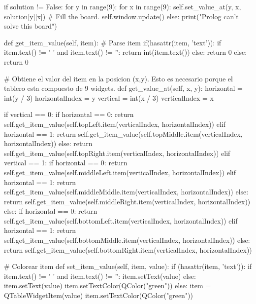 \documentclass[10pt,a4paper]{article}
\begin{document}
\begin{python}
        if solution != False:
            for y in range(9):
                for x in range(9):
                    self.set_value_at(y, x, solution[y][x]) # Fill the board.
            self.window.update()
        else:
            print("Prolog can't solve this board")

    def get_item_value(self, item): # Parse item
        if(hasattr(item, 'text')):
            if item.text() != ' ' and item.text() != '':
                return int(item.text())
            else:
                return 0
        else:
            return 0

    # Obtiene el valor del item en la posicion (x,y). Esto es necesario porque el tablero esta compuesto de 9 widgets.
    def get_value_at(self, x, y):
        horizontal = int(y / 3)
        horizontalIndex = y %
        vertical = int(x / 3)
        verticalIndex = x %

        if vertical == 0:
            if horizontal == 0:
                return self.get_item_value(self.topLeft.item(verticalIndex, horizontalIndex))
            elif horizontal == 1:
                return self.get_item_value(self.topMiddle.item(verticalIndex, horizontalIndex))
            else:
                return self.get_item_value(self.topRight.item(verticalIndex, horizontalIndex))
        elif vertical == 1:
            if horizontal == 0:
                return self.get_item_value(self.middleLeft.item(verticalIndex, horizontalIndex))
            elif horizontal == 1:
                return self.get_item_value(self.middleMiddle.item(verticalIndex, horizontalIndex))
            else:
                return self.get_item_value(self.middleRight.item(verticalIndex, horizontalIndex))
        else:
            if horizontal == 0:
                return self.get_item_value(self.bottomLeft.item(verticalIndex, horizontalIndex))
            elif horizontal == 1:
                return self.get_item_value(self.bottomMiddle.item(verticalIndex, horizontalIndex))
            else:
                return self.get_item_value(self.bottomRight.item(verticalIndex, horizontalIndex))

    # Colorear item
    def set_item_value(self, item, value):
        if (hasattr(item, 'text')):
            if item.text() != ' ' and item.text() != '':
                item.setText(value)
            else:
                item.setText(value)
                item.setTextColor(QColor("green"))
        else:
            item = QTableWidgetItem(value)
            item.setTextColor(QColor("green"))


\end{python}
\end{document}
